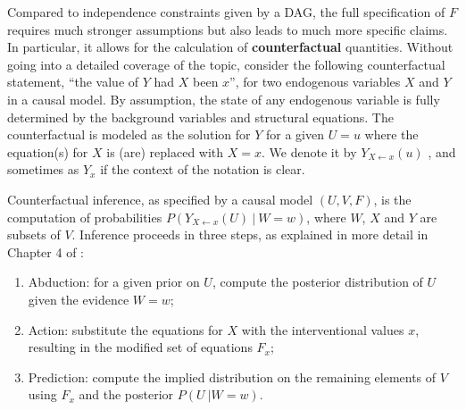 Compared to independence constraints given by a DAG, the full
specification of $F$ requires much stronger assumptions but also leads
to much more specific claims. In particular, it allows for the
calculation of {\bf counterfactual} quantities. Without going into a
detailed coverage of the topic, consider the following counterfactual
statement, ``the value of $Y$ had $X$ been $x$'', for two endogenous
variables $X$ and $Y$ in a causal model. By assumption, the state of
any endogenous variable is fully determined by
the background variables and structural equations. The counterfactual is
modeled as the solution for $Y$ for a given $U = u$ where the equation(s)
for $X$ is (are) replaced with $X = x$.  We denote it by $Y_{X \leftarrow x}(u)$
\cite{pearl:00}, and sometimes as $Y_x$ if the context of the notation is clear.

Counterfactual inference, as specified by a causal model $(U, V, F)$,
is the computation of probabilities $P(Y_{X \leftarrow x}(U)\ |\ W =
w)$, where $W$, $X$ and $Y$ are subsets of $V$. Inference proceeds in
three steps, as explained in more detail in Chapter 4 of
\cite{pearl:16}:
\begin{enumerate}
\item Abduction: for a given prior on $U$, compute the posterior
  distribution of $U$ given the evidence $W = w$;
\item Action: substitute the equations for $X$ with the interventional values $x$, resulting
     in the modified set of equations $F_x$;
\item Prediction: compute the implied distribution on the remaining elements of $V$
     using $F_x$ and the posterior $P(U\ | W = w)$.
\end{enumerate}



